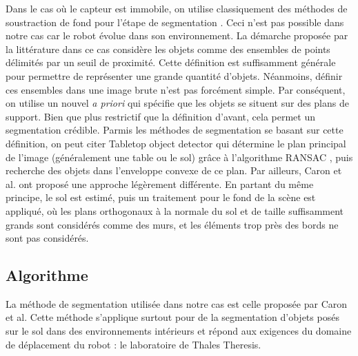 Dans le cas où le capteur est immobile, on utilise classiquement des méthodes de soustraction de fond pour l'étape de segmentation \cite{dai2006prospects}. Ceci n'est pas possible dans notre cas car le robot évolue dans son environnement. La démarche proposée par la littérature dans ce cas considère les objets comme des ensembles de points délimités par un seuil de proximité. Cette définition est suffisamment générale pour permettre de représenter une grande quantité d'objets. Néanmoins, définir ces ensembles dans une image brute n'est pas forcément simple. Par conséquent, on utilise un nouvel \textit{a priori} qui spécifie que les objets se situent sur des plans de support. Bien que plus restrictif que la définition d'avant, cela permet un segmentation crédible. Parmis les méthodes de segmentation se basant sur cette définition, on peut citer Tabletop object detector \cite{tabletop} qui détermine le plan principal de l'image (généralement une table ou le sol) grâce à l'algorithme RANSAC \cite{fischler1981random}, puis recherche des objets dans l'enveloppe convexe de ce plan. Par ailleurs, Caron et al. \cite{caron2014neural} ont proposé une approche légèrement différente. En partant du même principe, le sol est estimé, puis un traitement pour le fond de la scène est appliqué, où les plans orthogonaux à la normale du sol et de taille suffisamment grands sont considérés comme des murs, et les éléments trop près des bords ne sont pas considérés. 

\subsection{Algorithme}

La méthode de segmentation utilisée dans notre cas est celle proposée par Caron et al. Cette méthode s'applique surtout pour de la segmentation d'objets posés sur le sol dans des environnements intérieurs et répond aux exigences du domaine de déplacement du robot : le laboratoire de Thales Theresis.\\

